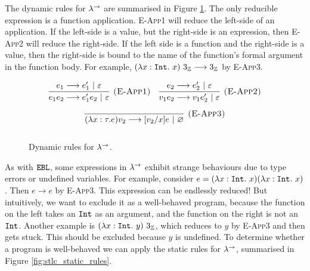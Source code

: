 The dynamic rules for $\lambda^{\rightarrow}$ are summarised in Figure \ref{fig:stlc_dynamic_rules}. The only reducible expression is a function application. \textsc{E-App1} will reduce the left-side of an application. If the left-side is a value, but the right-side is an expression, then \textsc{E-App2} will reduce the right-side. If the left side is a function and the right-side is a value, then the right-side is bound to the name of the function's formal argument in the function body. For example, $(\lambda x:\mathtt{Int}.~x)~3_{\mathbb{Z}} \longrightarrow 3_{\mathbb{Z}}$ by \textsc{E-App3}.

\begin{figure}[h]

\noindent
{}

\[
\begin{array}{c}

\infer[\textsc{(E-App1)}]
	{ e_1  e_2 \longrightarrow  e_1'  e_2~|~\varepsilon}
	{ e_1 \longrightarrow  e_1'~|~\varepsilon}
	~~~
\infer[\textsc{(E-App2)}]
	{ v_1  e_2 \longrightarrow  v_1  e_2'~|~\varepsilon} 
	{ e_2 \longrightarrow  e_2'~|~\varepsilon}\\[2ex]
	
\infer[\textsc{(E-App3)}]
	{ (\lambda x:  \tau. e)  v_2 \longrightarrow [ v_2/x] e~|~\varnothing }
	{}\\[2ex]
	
\end{array}
\]

\vspace{-12pt}
\caption{Dynamic rules for $\lambda^{\rightarrow}$.}
\label{fig:stlc_dynamic_rules}
\end{figure}

As with $\mathtt{EBL}$, some expressions in $\lambda^{\rightarrow}$ exhibit strange behaviours due to type errors or undefined variables. For example, consider $e = (\lambda x: \mathtt{Int}.~x) (\lambda x:\mathtt{Int}.~x)$. Then $e \longrightarrow e$ by \textsc{E-App3}. This expression can be endlessly reduced! But intuitively, we want to exclude it as a well-behaved program, because the function on the left takes an $\mathtt{Int}$ as an argument, and the function on the right is not an $\mathtt{Int}$. Another example is $(\lambda x: \mathtt{Int}.~y)~3_{\mathbb{Z}}$, which reduces to $y$ by \textsc{E-App3} and then gets stuck. This should be excluded because $y$ is undefined. To determine whether a program is well-behaved we can apply the static rules for $\lambda^{\rightarrow}$, summarised in Figure \ref{fig:stlc_static_rules}.


